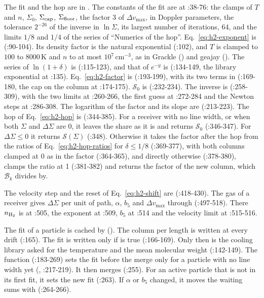 The fit and the hop are in .
The constants of the fit are at :38-76: the clamps of $T$ and $n$, $\Sigma_0$,
$\Sigma_{\rm cap}$, $\Sigma_{\rm floor}$, the factor 3 of $\Delta v_{\max}$, in
Doppler parameters, the tolerance $2^{-26}$ of the inverse in $\ln\Sigma$, its
largest number of iterations, 64, and the limits $1/8$ and $1/4$ of the series
of ``Numerics of the hop''.
Eq.~\eqref{eq:h2-exponent} is 
(:90-104). Its density factor is the natural exponential (:102), and $T$ is
clamped to $100$ to $8000$\,K and $n$ to at most $10^7$\,cm$^{-3}$, as in
Grackle () and geajay (). The series
of $\ln(1+\delta)$ is  (:115-123),
and that of $e^{-y}$ is  (:134-149, the
library exponential at :135). Eq.~\eqref{eq:h2-factor} is 
(:193-199), with its two terms in 
(:169-180, the cap on the column at :174-175). $\mathcal S_0$ is
 (:232-234). The inverse is
 (:258-309), with the two limits at
:260-266, the first guess at :272-284 and the Newton steps at :286-308. The
logarithm of the factor and its slope are
 (:213-223). The hop of Eq.~\eqref{eq:h2-hop} is
 (:344-385). For a receiver with no
line width, or when both $\Sigma$ and $\Delta\Sigma$ are 0, it leaves the share
as it is and returns $\mathcal S_0$ (:346-347). For $\Delta\Sigma\le0$ it
returns $\mathcal S(\Sigma)$ (:348). Otherwise it takes the factor after the hop
from the ratios of Eq.~\eqref{eq:h2-hop-ratios} for $\delta\le1/8$ (:369-377),
with both columns clamped at 0 as in the factor (:364-365),
and directly otherwise (:378-380), clamps the ratio at 1 (:381-382) and
returns the factor of the new column, which $\mathcal B_k$ divides by.

The velocity step and the reset of Eq.~\eqref{eq:h2-shift} are
 (:418-430). The gas of a receiver gives
$\Delta\Sigma$ per unit of path, $\alpha$, $b_5$ and $\Delta v_{\max}$ through
 (:497-518). There $n_{{\rm H}_2}$
is at :505, the exponent at :509, $b_5$ at :514 and the velocity limit at
:515-516.

The fit of a particle is cached by 
(). The column per length is written at every
drift (:165). The fit is written only if  is true (:166-169).
Only then is the cooling library asked for the temperature and the mean
molecular weight (:142-149). The function
 (:183-269) sets the fit before the merge only for a particle with no line width yet
(, :217-219). It then merges (:255). For an active particle
that is not in its first fit, it sets the new fit (:263). If $\alpha$ or $b_5$
changed, it moves the waiting sums with 
(:264-266).

